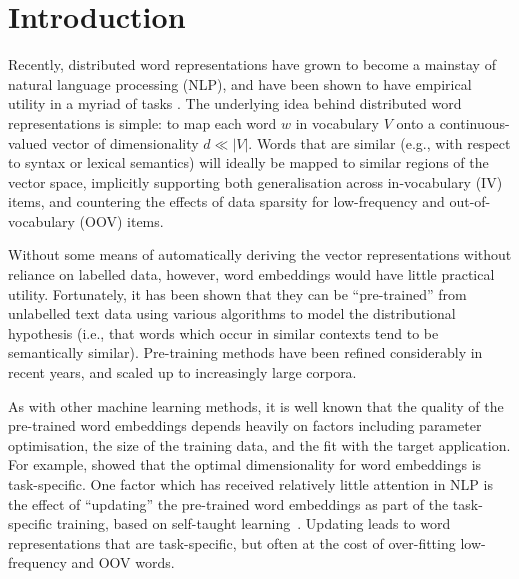 \section{Introduction}

Recently, distributed word representations have grown to become a
mainstay of natural language processing (NLP), and have been shown to have
empirical utility in a myriad of tasks
\cite{Collobert2008,turian2010word,baroni:2014,Andreas:Klein:2014}.  The
underlying idea behind distributed word representations is simple: to
map each word $w$ in vocabulary $V$ onto a continuous-valued vector
of dimensionality $d \ll |V|$.  Words that are similar
(e.g., with respect to syntax or lexical semantics) will ideally be mapped to
similar regions of the vector space, implicitly supporting both
generalisation across in-vocabulary (IV) items, and countering the
effects of data sparsity for low-frequency and out-of-vocabulary (OOV)
items.

Without some means of automatically deriving the vector representations
without reliance on labelled data, however, word embeddings would have
little practical utility. Fortunately, it has been shown that they can
be ``pre-trained'' from unlabelled text data using various algorithms 
to model the distributional hypothesis (i.e., that
words which occur in similar contexts tend to be semantically
similar). Pre-training methods have been refined considerably in recent
years, and scaled up to increasingly large corpora.

As with other machine learning methods, it is well known that the
quality of the pre-trained word embeddings depends heavily on factors
including parameter optimisation, the size of the training data, and the
fit with the target application. For example, 
showed that the optimal dimensionality for word embeddings is task-specific.  
One factor which has received relatively little attention in
NLP is the effect of ``updating'' the pre-trained word embeddings as
part of the task-specific training, based on self-taught
learning~\cite{raina2007self}.  Updating leads to word
representations that are task-specific, but often at the cost of
over-fitting low-frequency and OOV words.


